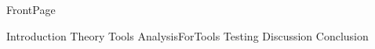 \documentclass{article}
\begin{document}
{FrontPage}

\frontmatter


\mainmatter

\newpage
\tableofcontents
\newpage
\listoffigures
\listoftables


\printglossary[type=\acronymtype]
\printglossary
\newpage


{Introduction}
{Theory}
{Tools}
{AnalysisForTools}
{Testing}
{Discussion}
{Conclusion}


\newpage
\printbibliography[heading = bibintoc, title = Bibliography]    





\end{document}
